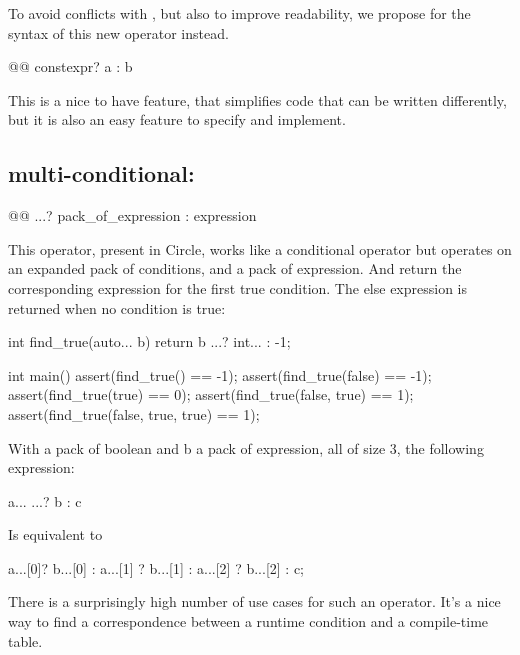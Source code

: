 \documentclass{wg21}
\begin{document}
To avoid conflicts with , but also to improve readability, we propose  for the syntax of this new operator instead.

\begin{colorblock}
@@ constexpr? a : b
\end{colorblock}

This is a nice to have feature, that simplifies code that can be written differently, but it is also an easy feature to specify and implement.

\subsection{multi-conditional: }

\begin{colorblock}
@@ ...? pack_of_expression : expression
\end{colorblock}

This operator, present in Circle, works like a conditional operator but operates on an expanded pack of conditions, and a pack of expression.
And return the corresponding expression for the first true condition. The else expression is returned when no condition is true:

\begin{colorblock}
int find_true(auto... b) {
    return b ...? int... : -1;
}

int main() {
    assert(find_true() == -1);
    assert(find_true(false) == -1);
    assert(find_true(true) == 0);
    assert(find_true(false, true) == 1);
    assert(find_true(false, true, true) == 1);
}
\end{colorblock}

With a pack of boolean and b a pack of expression, all of size 3, the following expression:

\begin{colorblock}
a... ...? b : c
\end{colorblock}

Is equivalent to

\begin{colorblock}
a...[0]? b...[0] : a...[1] ? b...[1] : a...[2] ? b...[2] : c;
\end{colorblock}


There is a surprisingly high number of use cases for such an operator.
It's a nice way to find a correspondence between a runtime condition and a compile-time table.
\end{document}
